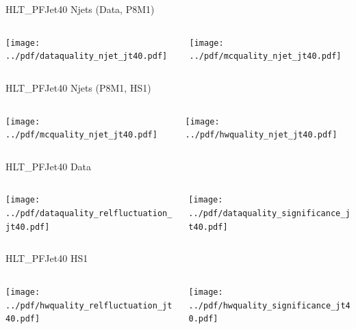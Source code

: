 \documentclass[9pt]{beamer}
\begin{document}
\begin{frame}[t]{HLT\_PFJet40 Njets (Data, P8M1)}
\begin{columns}[T]
  \begin{column}{.5\textwidth}
  \texttt{[image: ../pdf/dataquality\_njet\_jt40.pdf]}
  \end{column}
  \begin{column}{.5\textwidth}
  \texttt{[image: ../pdf/mcquality\_njet\_jt40.pdf]}
  \end{column}
\end{columns}
\end{frame}

\begin{frame}[t]{HLT\_PFJet40 Njets (P8M1, HS1)}
\begin{columns}[T]
  \begin{column}{.5\textwidth}
  \texttt{[image: ../pdf/mcquality\_njet\_jt40.pdf]}
  \end{column}
  \begin{column}{.5\textwidth}
  \texttt{[image: ../pdf/hwquality\_njet\_jt40.pdf]}
  \end{column}
\end{columns}
\end{frame}

\begin{frame}[t]{HLT\_PFJet40 Data}
\begin{columns}[T]
  \begin{column}{.5\textwidth}
  \texttt{[image: ../pdf/dataquality\_relfluctuation\_jt40.pdf]}
  \end{column}
  \begin{column}{.5\textwidth}
  \texttt{[image: ../pdf/dataquality\_significance\_jt40.pdf]}
  \end{column}
\end{columns}
\end{frame}

\begin{frame}[t]{HLT\_PFJet40 HS1}
\begin{columns}[T]
  \begin{column}{.5\textwidth}
  \texttt{[image: ../pdf/hwquality\_relfluctuation\_jt40.pdf]}
  \end{column}
  \begin{column}{.5\textwidth}
  \texttt{[image: ../pdf/hwquality\_significance\_jt40.pdf]}
  \end{column}
\end{columns}
\end{frame}
\end{document}
